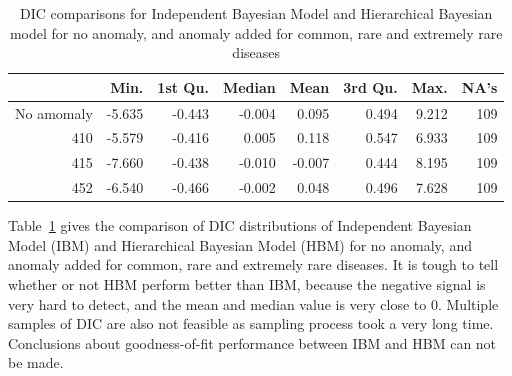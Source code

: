 
\begin{table}[!h]
	\centering
	\begin{tabular}{rrrrrrrr}
		\hline
		& Min. & 1st Qu. & Median & Mean & 3rd Qu. & Max. & NA's \\ 
		\hline
		No amomaly & -5.635 & -0.443 & -0.004 & 0.095 & 0.494 & 9.212 & 109 \\ 
		410 & -5.579 & -0.416 & 0.005 & 0.118 & 0.547 & 6.933 & 109 \\ 
		415 & -7.660 & -0.438 & -0.010 & -0.007 & 0.444 & 8.195 & 109 \\ 
		452 & -6.540 & -0.466 & -0.002 & 0.048 & 0.496 & 7.628 & 109 \\ 
		\hline
	\end{tabular}
	\caption{DIC comparisons for Independent Bayesian Model and Hierarchical Bayesian model for no anomaly, and anomaly added for common, rare and extremely rare diseases} 
	\label{tab:dicmimic}
\end{table}

\newpara

Table~\ref{tab:dicmimic} gives the comparison of DIC distributions of Independent Bayesian Model (IBM) and Hierarchical Bayesian Model (HBM) for no anomaly, and anomaly added for common, rare and extremely rare diseases. It is tough to tell whether or not HBM perform better than IBM, because the negative signal is very hard to detect, and the mean and median value is very close to 0. Multiple samples of DIC are also not feasible as sampling process took a very long time. Conclusions about goodness-of-fit performance between IBM and HBM can not be made. 




\newpage

